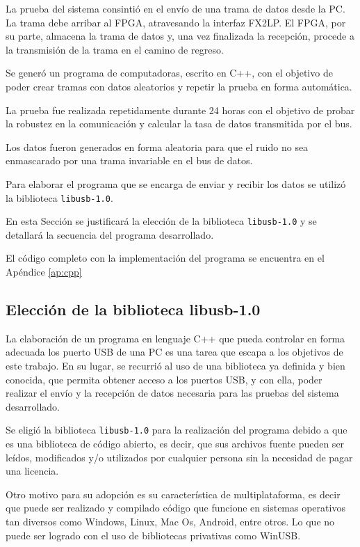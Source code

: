 
La prueba del sistema consintió en el envío de una trama de datos desde la PC. La trama debe arribar al FPGA, atravesando la interfaz FX2LP.
El FPGA, por su parte, almacena la trama de datos y, una vez finalizada la recepción, procede a la transmisión de la trama en el camino de regreso. 

Se generó un programa de computadoras, escrito en C++, con el objetivo de poder crear tramas con datos aleatorios y repetir la prueba en forma automática.

La prueba fue realizada repetidamente durante 24 horas con el objetivo de probar la robustez en la comunicación y calcular la tasa de datos transmitida por el bus.

Los datos fueron generados en forma aleatoria para que el ruido no sea enmascarado por una trama invariable en el bus de datos.

Para elaborar el programa que se encarga de enviar y recibir los datos se utilizó la biblioteca \verb|libusb-1.0|.

En esta Sección se justificará la elección de la biblioteca \verb|libusb-1.0| y se detallará la secuencia del programa desarrollado.

El código completo con la implementación del programa se encuentra en el Apéndice \ref{ap:cpp}

\subsection{Elección de la biblioteca libusb-1.0}
	La elaboración de un programa en lenguaje C++ que pueda controlar en forma adecuada los puerto USB de una PC es una tarea que escapa a los objetivos de este trabajo. En su lugar, se recurrió al uso de una biblioteca ya definida y bien conocida, que permita obtener acceso a los puertos USB, y con ella, poder realizar el envío y la recepción de datos necesaria para las pruebas del sistema desarrollado.
	
	Se eligió la biblioteca \verb|libusb-1.0| para la realización del programa debido a que es una biblioteca de código abierto, es decir,  que sus archivos fuente pueden ser leídos, modificados y/o utilizados por cualquier persona sin la necesidad de pagar una licencia. 

	Otro motivo para su adopción es su característica de multiplataforma, es decir que puede ser realizado y compilado código que funcione en sistemas operativos tan diversos como Windows, Linux, Mac Os, Android, entre otros. Lo que no puede ser logrado con el uso de bibliotecas privativas como WinUSB.
	
